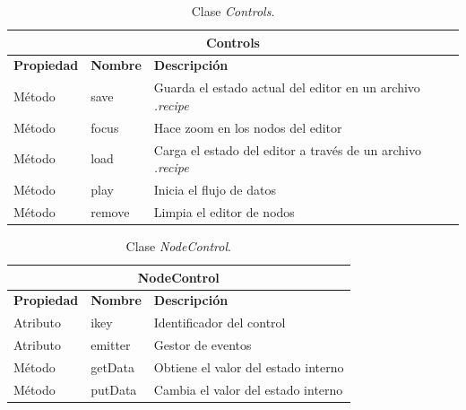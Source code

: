 \begin{table}[H]
    \begin{center}
        \begin{tabularx}{\textwidth}{| l | l | X |}
            \hline
            \multicolumn{3}{c}{ \textbf{Controls} } \\ \hline
            \textbf{Propiedad} & \textbf{Nombre} & \textbf{Descripción} \\ \hline
            Método & save & Guarda el estado actual del editor en un archivo \textit{.recipe} \\ \hline
            Método & focus & Hace zoom en los nodos del editor \\ \hline
            Método & load & Carga el estado del editor a través de un archivo \textit{.recipe} \\ \hline
            Método & play & Inicia el flujo de datos \\ \hline
            Método & remove & Limpia el editor de nodos \\ \hline
        \end{tabularx}
    \end{center}
    \caption{Clase \textit{Controls}.}
    \label{tab:classControls}
\end{table}

\begin{table}[H]
    \begin{center}
        \begin{tabularx}{\textwidth}{| l | l | X |}
            \hline
            \multicolumn{3}{c}{ \textbf{NodeControl} } \\ \hline
            \textbf{Propiedad} & \textbf{Nombre} & \textbf{Descripción} \\ \hline
            Atributo & ikey & Identificador del control \\ \hline
            Atributo & emitter & Gestor de eventos \\ \hline
            Método & getData & Obtiene el valor del estado interno \\ \hline
            Método & putData & Cambia el valor del estado interno \\ \hline
        \end{tabularx}
    \end{center}
    \caption{Clase \textit{NodeControl}.}
    \label{tab:classNodeControl}
\end{table}


